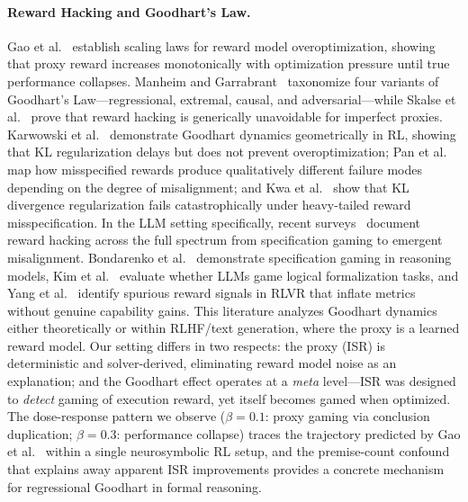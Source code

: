 \paragraph{Reward Hacking and Goodhart's Law.}
Gao et al.~\cite{gao-reward-overoptimization} establish scaling laws for reward model overoptimization, showing that proxy reward increases monotonically with optimization pressure until true performance collapses.
Manheim and Garrabrant~\cite{manheim-goodhart-taxonomy} taxonomize four variants of Goodhart's Law---regressional, extremal, causal, and adversarial---while Skalse et al.~\cite{skalse-reward-hacking} prove that reward hacking is generically unavoidable for imperfect proxies.
Karwowski et al.~\cite{karwowski-goodhart-rl} demonstrate Goodhart dynamics geometrically in RL, showing that KL regularization delays but does not prevent overoptimization; Pan et al.~\cite{pan-reward-misspecification} map how misspecified rewards produce qualitatively different failure modes depending on the degree of misalignment; and Kwa et al.~\cite{kwa-catastrophic-goodhart} show that KL divergence regularization fails catastrophically under heavy-tailed reward misspecification.
In the LLM setting specifically, recent surveys~\cite{reward-hacking-survey} document reward hacking across the full spectrum from specification gaming to emergent misalignment.
Bondarenko et al.~\cite{bondarenko-spec-gaming} demonstrate specification gaming in reasoning models, Kim et al.~\cite{kim-game-formalization} evaluate whether LLMs game logical formalization tasks, and Yang et al.~\cite{spurious-rewards} identify spurious reward signals in RLVR that inflate metrics without genuine capability gains.
This literature analyzes Goodhart dynamics either theoretically or within RLHF/text generation, where the proxy is a learned reward model.
Our setting differs in two respects: the proxy (ISR) is deterministic and solver-derived, eliminating reward model noise as an explanation; and the Goodhart effect operates at a \emph{meta} level---ISR was designed to \emph{detect} gaming of execution reward, yet itself becomes gamed when optimized.
The dose-response pattern we observe ($\beta{=}0.1$: proxy gaming via conclusion duplication; $\beta{=}0.3$: performance collapse) traces the trajectory predicted by Gao et al.~\cite{gao-reward-overoptimization} within a single neurosymbolic RL setup, and the premise-count confound that explains away apparent ISR improvements provides a concrete mechanism for regressional Goodhart in formal reasoning.

